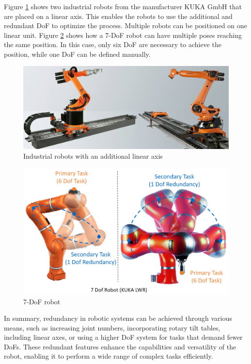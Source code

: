 Figure \ref{linear} shows two industrial robots from the manufacturer KUKA GmbH that are placed on a linear axis. This enables the robots to use the additional and redundant \acrshort{DoF} to optimize the process. Multiple robots can be positioned on one linear unit. 
Figure \ref{seven} shows how a 7-\acrshort{DoF} robot can have multiple poses reaching the same position. In this case, only six \acrshort{DoF} are necessary to achieve the position, while one \acrshort{DoF} can be defined manually.

\begin{figure}[H]
	\centerline{\includegraphics[scale=.4]{figures/linear.png}}
	\caption{Industrial robots with an additional linear axis~\cite{linear}}
	\label{linear}
\end{figure}

\begin{figure}[H]
	\centerline{\includegraphics[scale=.14]{figures/red.png}}
	\caption{7-\acrshort{DoF} robot~\cite{Hagane.2022}}
	\label{seven}
\end{figure}

In summary, redundancy in robotic systems can be achieved through various means, such as increasing joint numbers, incorporating rotary tilt tables, including linear axes, or using a higher \acrshort{DoF} system for tasks that demand fewer \acrshort{DoF}s. These redundant features enhance the capabilities and versatility of the robot, enabling it to perform a wide range of complex tasks efficiently.

